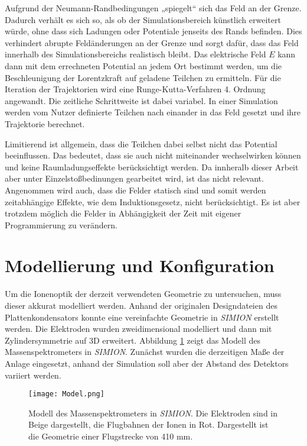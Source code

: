 Aufgrund der Neumann-Randbedingungen „spiegelt“ sich das Feld an der Grenze. Dadurch verhält es sich so, als ob der Simulationsbereich künstlich erweitert würde, ohne dass sich Ladungen oder Potentiale jenseits des Rands befinden. Dies verhindert abrupte Feldänderungen an der Grenze und sorgt dafür, dass das Feld innerhalb des Simulationsbereichs realistisch bleibt. Das elektrische Feld $E$ kann dann mit dem errechneten Potential an jedem Ort bestimmt werden, um die Beschleunigung der Lorentzkraft auf geladene Teilchen zu ermitteln. Für die Iteration der Trajektorien wird eine Runge-Kutta-Verfahren 4. Ordnung angewandt. Die zeitliche Schrittweite ist dabei variabel. In einer Simulation werden vom Nutzer definierte Teilchen nach einander in das Feld gesetzt und ihre Trajektorie berechnet. 

Limitierend ist allgemein, dass die Teilchen dabei selbst nicht das Potential beeinflussen. Das bedeutet, dass sie auch nicht miteinander wechselwirken können und keine Raumladungseffekte berücksichtigt werden. Da innheralb dieser Arbeit aber unter Einzelstoßbedinungen gearbeitet wird, ist das nicht relevant. Angenommen wird auch, dass die Felder statisch sind und somit werden zeitabhängige Effekte, wie dem Induktionsgesetz, nicht berücksichtigt. Es ist aber trotzdem möglich die Felder in Abhängigkeit der Zeit mit eigener Programmierung zu verändern.

\section{Modellierung und Konfiguration}
Um die Ionenoptik der derzeit verwendeten Geometrie zu untersuchen, muss dieser akkurat modelliert werden. Anhand der originalen Designdateien des Plattenkondensators konnte eine vereinfachte Geometrie in \textit{SIMION} erstellt werden. Die Elektroden wurden zweidimensional modelliert und dann mit Zylindersymmetrie auf 3D erweitert. Abbildung \ref{fig:model} zeigt das Modell des Massenspektrometers in \textit{SIMION}. Zunächst wurden die derzeitigen Maße der Anlage eingesetzt, anhand der Simulation soll aber der Abstand des Detektors variiert werden.

\begin{figure}
    \centering
    \texttt{[image: Model.png]}
    \caption[Modell des Massenspektrometers in \textit{SIMION}]{Modell des Massenspektrometers in \textit{SIMION}. Die Elektroden sind in Beige dargestellt, die Flugbahnen der Ionen in Rot. Dargestellt ist die Geometrie einer Flugstrecke von 410 mm.}
    \label{fig:model}
\end{figure}

